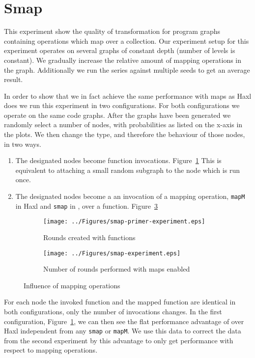 \section{Smap}

This experiment show the quality of transformation for program graphs containing operations which map over a collection.
Our experiment setup for this experiment operates on several graphs of constant depth (number of levels is constant).
We gradually increase the relative amount of mapping operations in the graph.
Additionally we run the series against multiple seeds to get an average result.

In order to show that we in fact achieve the same performance with maps as Haxl does we run this experiment in two configurations.
For both configurations we operate on the same code graphs.
After the graphs have been generated we randomly select a number of nodes, with probabilities as listed on the x-axis in the plots.
We then change the type, and therefore the behaviour of those nodes, in two ways.

\begin{enumerate}
  \item The designated nodes become function invocations. Figure~\ref{fig:smap-experiment-primer}
        This is equivalent to attaching a small random subgraph to the node which is run once.
  \item The designated nodes become a an invocation of a mapping operation, \texttt{mapM} in Haxl and \texttt{smap} in \yauhau{}, over a function. Figure~\ref{fig:smap-experiment}
\end{enumerate}

\begin{figure}[h]
  \begin{subfigure}{\textwidth}
      \texttt{[image: ../Figures/smap-primer-experiment.eps]}
      \caption{Rounds created with functions}
      \label{fig:smap-experiment-primer}
  \end{subfigure}

  \begin{subfigure}{\textwidth}
      \texttt{[image: ../Figures/smap-experiment.eps]}
      \caption{Number of rounds performed with maps enabled}
      \label{fig:smap-experiment}
  \end{subfigure}

  \caption{Influence of mapping operations}
\end{figure}

For each node the invoked function and the mapped function are identical in both configurations, only the number of invocations changes.
In the first configuration, Figure~\ref{fig:smap-experiment-primer}, we can then see the flat performance advantage of \yauhau{} over Haxl independent from any \texttt{smap} or \texttt{mapM}.
We use this data to correct the data from the second experiment by this advantage to only get performance with respect to mapping operations.

